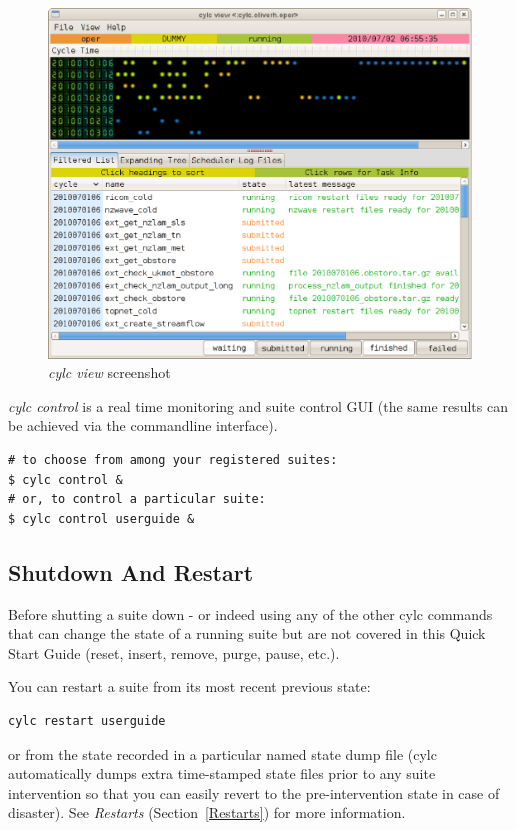 \documentclass[11pt,a4paper]{article}
\begin{document}
\begin{figure}
    \begin{center}
        \includegraphics[width=12cm]{cylc-view-ecoconnect} 
    \end{center}
    \caption{\small {\em cylc view} screenshot}
    \label{fig-monitor} 
\end{figure} 

{\em cylc control} is a real time monitoring and suite control GUI
(the same results can be achieved via the commandline interface).

\begin{lstlisting}
# to choose from among your registered suites:
$ cylc control &
# or, to control a particular suite:
$ cylc control userguide &
\end{lstlisting}

\subsection{Shutdown And Restart}
\label{QuickShutdownAndRestart}

\lstset{language=bash}

Before shutting a suite down - or indeed using any of the other cylc
commands that can change the state of a running suite but are not 
covered in this Quick Start Guide (reset, insert, remove, purge, pause,
etc.).

You can restart a suite from its most recent previous state:

\begin{lstlisting}
cylc restart userguide
\end{lstlisting}
or from the state recorded in a particular named state dump file 
(cylc automatically dumps extra time-stamped state files prior to any
suite intervention so that you can easily revert to the
pre-intervention state in case of disaster). See {\em Restarts}
(Section~\ref{Restarts}) for more information.
\end{document}

